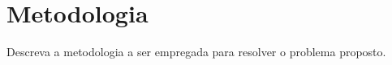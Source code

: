 \chapter{Metodologia} 


\label{cap:metodologia}


Descreva a metodologia a ser empregada para resolver o problema proposto.
